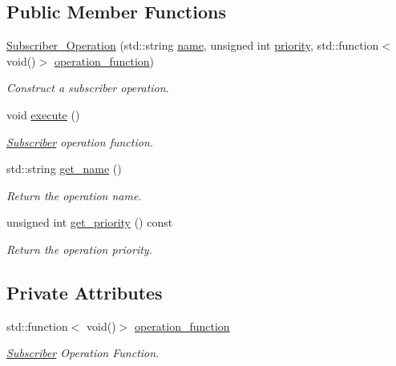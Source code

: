 \subsection*{Public Member Functions}
\begin{DoxyCompactItemize}
\item 
\hyperlink{classzcm_1_1Subscriber__Operation_aa0422263c6afea8bba3aa55b4c4e8c84}{Subscriber\-\_\-\-Operation} (std\-::string \hyperlink{classzcm_1_1Base__Operation_a2e2192550818d8f063fc7b2c76c5e21c}{name}, unsigned int \hyperlink{classzcm_1_1Base__Operation_a38af3bcc2578ef215772d595bf3fa358}{priority}, std\-::function$<$ void()$>$ \hyperlink{classzcm_1_1Subscriber__Operation_a5e3ca90f3ea6f1342d76f49363206e06}{operation\-\_\-function})
\begin{DoxyCompactList}\small\item\em Construct a subscriber operation. \end{DoxyCompactList}\item 
void \hyperlink{classzcm_1_1Subscriber__Operation_a2677079c7f3dd85cfc548427c1c101e6}{execute} ()
\begin{DoxyCompactList}\small\item\em \hyperlink{classzcm_1_1Subscriber}{Subscriber} operation function. \end{DoxyCompactList}\item 
std\-::string \hyperlink{classzcm_1_1Base__Operation_a46b6a3f23e18bc35425ec2dab80c849f}{get\-\_\-name} ()
\begin{DoxyCompactList}\small\item\em Return the operation name. \end{DoxyCompactList}\item 
unsigned int \hyperlink{classzcm_1_1Base__Operation_a3b15b35c31ed173d2abb193e9fba32ef}{get\-\_\-priority} () const 
\begin{DoxyCompactList}\small\item\em Return the operation priority. \end{DoxyCompactList}\end{DoxyCompactItemize}
\subsection*{Private Attributes}
\begin{DoxyCompactItemize}
\item 
std\-::function$<$ void()$>$ \hyperlink{classzcm_1_1Subscriber__Operation_a5e3ca90f3ea6f1342d76f49363206e06}{operation\-\_\-function}
\begin{DoxyCompactList}\small\item\em \hyperlink{classzcm_1_1Subscriber}{Subscriber} Operation Function. \end{DoxyCompactList}\end{DoxyCompactItemize}


